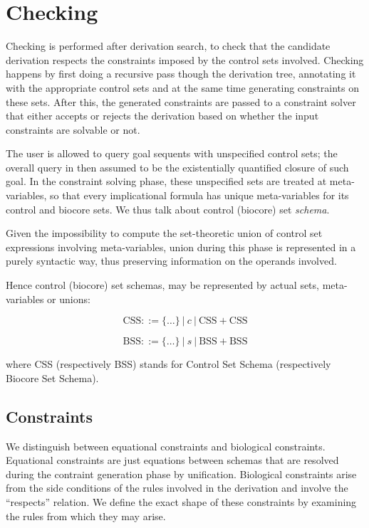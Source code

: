\section{Checking}

Checking is performed after derivation search, to check that the candidate
derivation respects the constraints imposed by the control sets involved.
Checking happens by first doing a recursive pass though the derivation tree,
annotating it with the appropriate control sets and at the same time generating
constraints on these sets. After this, the generated constraints are passed to a
constraint solver that either accepts or rejects the derivation based on whether
the input constraints are solvable or not.

The user is allowed to query goal sequents with unspecified control sets; the
overall query in then assumed to be the existentially quantified closure of such
goal. In the constraint solving phase, these unspecified sets are treated at
meta-variables, so that every implicational formula has unique meta-variables
for its control and biocore sets. We thus talk about control (biocore) set
\emph{schema}.

Given the impossibility to compute the set-theoretic union of control set
expressions involving meta-variables, union during this phase is represented in
a purely syntactic way, thus preserving information on the operands involved.

Hence control (biocore) set schemas, may be represented by actual sets,
meta-variables or unions:

\[
  \mathrm{CSS} ::= \{\dots\} \ | \ c \ | \ \mathrm{CSS} + \mathrm{CSS}
\]

\[
  \mathrm{BSS} ::= \{\dots\} \ | \ s \ | \ \mathrm{BSS} + \mathrm{BSS}
\]

where CSS (respectively BSS) stands for Control Set Schema (respectively Biocore
Set Schema).

\subsection{Constraints}

We distinguish between equational constraints and biological
constraints. Equational constraints are just equations between schemas that are
resolved during the contraint generation phase by unification. Biological
constraints arise from the side conditions of the rules involved in the
derivation and involve the ``respects'' relation.
We define the exact shape of these constraints by examining the rules from which
they may arise.

